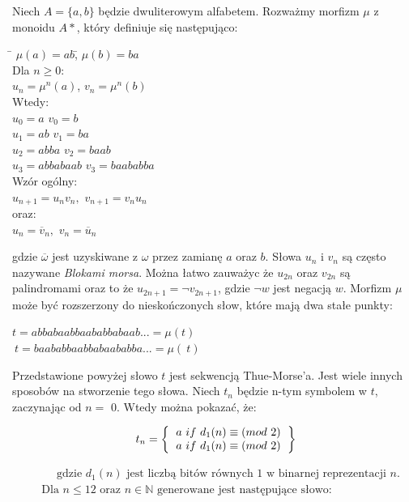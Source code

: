 \documentclass[document]{xmgr}
\begin{document}
Niech $A = \{a, b\}$ będzie dwuliterowym alfabetem. Rozważmy morfizm $\mu$ z monoidu $A*$, który definiuje się następująco:



\begin{tabbing}

\hspace{8em}\= $\mu(a) = ab$,\hspace{7em}\= $\mu(b) = ba$\\
Dla $n \geq 0$:\\
\> $u_n = \mu^n(a)$,\> $v_n = \mu^n(b)$\\
Wtedy:\\
\> $u_0 = a$ \> $v_0 = b$\\
\> $u_1 = ab$ \> $v_1 = ba$\\
\> $u_2 = abba$	 \> $v_2 = baab$\\
\> $u_3 = abbabaab$ \> $v_3 = baababba$\\
Wzór ogólny:\\
\> $u_{n+1} = u_n v_n,$ \> $v_{n+1} = v_n u_n$\\
oraz:\\
\> $u_n = \overline{v}_n,$ \> $v_n = \overline{u}_n$
\end{tabbing}

gdzie $\overline{\omega}$ jest uzyskiwane z $\omega$ przez zamianę $a$ oraz $b$. Słowa $u_n$ i $v_n$ są często nazywane \textit{Blokami morsa}. Można łatwo zauważyc że $u_{2n}$ oraz $v_{2n}$ są palindromami oraz to że $u_{2n+1} = \neg v_{2n+1}$, gdzie $\neg w$ jest negacją $w$. Morfizm $\mu$ może być rozszerzony do nieskończonych słow, które mają dwa stałe punkty:

{\centering 
$t = abbabaabbaababbabaab... = \mu(t)$ \\
$~t = baababbaabbabaababba... = \mu(~t)$
\par}

Przedstawione powyżej słowo $t$ jest sekwencją Thue-Morse'a. Jest wiele innych sposobów na stworzenie tego słowa. Niech $t_n$ będzie n-tym symbolem w $t$, zaczynając od $n =$ 0. Wtedy można pokazać, że:

\[
t_n=
\left \{
\begin{tabular}{ccc}
$a\ if\ d_1(n) \equiv (mod\ 2)$ \\
$a\ if\ d_1(n) \equiv (mod\ 2)$
\end{tabular}
\right \}
\]

\begin{align*}
  &\phantom{{}\leq{}} \text{gdzie } d_1(n) \text{ jest liczbą bitów równych 1 w binarnej reprezentacji } n \text{.}  \\
  & \text{Dla } n \leq 12 \text{ oraz } n \in \mathbb{N} \text{ generowane jest następujące słowo:}  \\
\end{align*}
\end{document}

